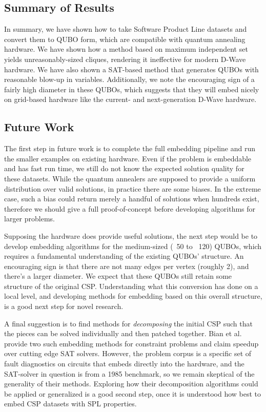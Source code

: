 \documentclass{sig-alternate-05-2015}
\begin{document}
\subsection{Summary of Results}
In summary, we have shown how to take Software Product Line datasets and convert them to QUBO form, which are compatible with quantum annealing hardware. We have shown how a method based on maximum independent set yields unreasonably-sized cliques, rendering it ineffective for modern D-Wave hardware. We have also shown a SAT-based method that generates QUBOs with reasonable blow-up in variables. Additionally, we note the encouraging sign of a fairly high diameter in these QUBOs, which suggests that they will embed nicely on grid-based hardware like the current- and next-generation D-Wave hardware.

\subsection{Future Work}
The first step in future work is to complete the full embedding pipeline and run the smaller examples on existing hardware. Even if the problem is embeddable and has fast run time, we still do not know the expected solution quality for these datasets. While the quantum annealers are supposed to provide a uniform distribution over valid solutions, in practice there are some biases. In the extreme case, such a bias could return merely a handful of solutions when hundreds exist, therefore we should give a full proof-of-concept before developing algorithms for larger problems.

Supposing the hardware does provide useful solutions, the next step would be to develop embedding algorithms for the medium-sized (~50 to ~120) QUBOs, which requires a fundamental understanding of the existing QUBOs' structure. An encouraging sign is that there are not many edges per vertex (roughly 2), and there's a larger diameter. We expect that these QUBOs still retain some structure of the original CSP. Understanding what this conversion has done on a local level, and developing methods for embedding based on this overall structure, is a good next step for novel research.

A final suggestion is to find methods for \emph{decomposing} the initial CSP such that the pieces can be solved individually and then patched together. Bian et al. \cite{bian2016mapping} provide two such embedding methods for constraint problems and claim speedup over cutting edge SAT solvers. However, the problem corpus is a specific set of fault diagnostics on circuits that embeds directly into the hardware, and the SAT-solver in question is from a 1985 benchmark, so we remain skeptical of the generality of their methods. Exploring how their decomposition algorithms could be applied or generalized is a good second step, once it is understood how best to embed CSP datasets with SPL properties.
\end{document}
